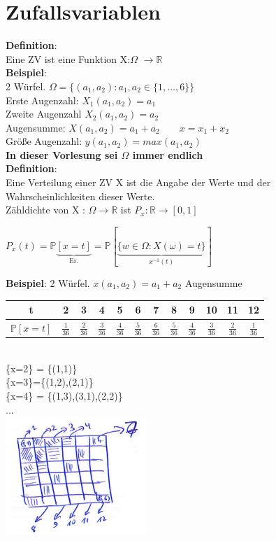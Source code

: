 \chapter{Zufallsvariablen}
\textbf{Definition}:\\
Eine ZV ist eine Funktion X:$\Omega$ $\rightarrow \mathbb{R}$\smallskip\\\textbf{Beispiel}:\\
2 Würfel. \hspace{1cm}$\Omega = \{(a_1,a_2): a_1,a_2 \in \{1,...,6\}\}$\medskip\\
Erste Augenzahl: $X_1(a_1,a_2)=a_1$\\
Zweite Augenzahl $X_2(a_1,a_2)=a_2$\\
Augensumme: $X(a_1,a_2) = a_1 + a_2 \qquad x = x_1 + x_2$\\
Größe Augenzahl: $y(a_1,a_2)=max(a_1,a_2)$\medskip\\
\textbf{In dieser Vorlesung sei $\Omega$ immer endlich}\medskip\\
\textbf{Definition}:\\
Eine Verteilung einer ZV X ist die Angabe der Werte und der Wahrscheinlichkeiten dieser Werte.\smallskip\\
	Zähldichte von X : $\Omega \rightarrow\mathbb{R}$ ist $P_x:\mathbb{R}\rightarrow[0,1]$\medskip
\begin{center}
	$P_x(t)=\mathds{P}\underbrace{[x = t]}_\text{Er.} = \mathds{P}[\underbrace{\{w \in \Omega:X(\omega)=t\}}_{x^{-1}(t)}]$\medskip\\
\end{center}
	
\textbf{Beispiel}: 2 Würfel. \hspace{1cm} $x(a_1,a_2) = a_1 + a_2$ Augensumme\medskip\\
\begin{tabular}{c|c|c|c|c|c|c|c|c|c|c|c|}
	t&2&3&4&5&6&7&8&9&10&11&12\\\hline
	$\mathds{P}[x=t]$&$\frac{1}{36}$&$\frac{2}{36}$&$\frac{3}{36}$&$\frac{4}{36}$&$\frac{5}{36}$&$\frac{6}{36}$&$\frac{5}{36}$&$\frac{4}{36}$&$\frac{3}{36}$&$\frac{2}{36}$&$\frac{1}{36}$
\end{tabular}\medskip\\
\{x=2\} = \{(1,1)\}\\
\{x=3\}=\{(1,2),(2,1)\}\\
\{x=4\} = \{(1,3),(3,1),(2,2)\}\\
...\medskip\\
\includegraphics[width=0.4\textwidth]{img/okay.PNG}\\


